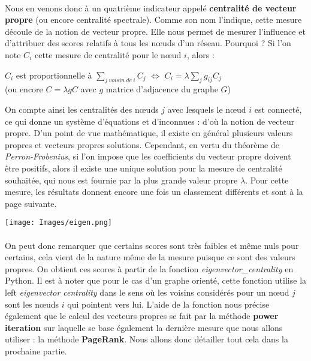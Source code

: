 \documentclass[14pt, openany]{article}
\begin{document}
\paragraph{}
Nous en venons donc à un quatrième indicateur appelé \textbf{centralité de vecteur propre} (ou encore centralité spectrale). Comme son nom l'indique, cette mesure découle de la notion de vecteur propre. Elle nous permet de mesurer l'influence et d'attribuer des scores relatifs à tous les nœuds d'un réseau. Pourquoi ? Si l'on note $C_i$ cette mesure de centralité pour le nœud $i$, alors :\\
\begin{center}
$C_i$ est proportionnelle à $\sum\limits_{j~voisin~de~i}C_j$ $\Leftrightarrow$ $C_i = \lambda\sum\limits_{j}g_{ij}C_j$\\ (ou encore $C=\lambda g C$ avec $g$ matrice d'adjacence du graphe $G$)
\end{center}
On compte ainsi les centralités des nœuds $j$ avec lesquels le nœud $i$ est connecté, ce qui donne un système d'équations et d'inconnues : d'où la notion de vecteur propre. D'un point de vue mathématique, il existe en général plusieurs valeurs propres et vecteurs propres solutions. Cependant, en vertu du théorème de \textit{Perron-Frobenius}, si l'on impose que les coefficients du vecteur propre doivent être positifs, alors il existe une unique solution pour la mesure de centralité souhaitée, qui nous est fournie par la plus grande valeur propre $\lambda$. Pour cette mesure, les résultats donnent encore une fois un classement différents et sont à la page suivante.
\begin{center}
\texttt{[image: Images/eigen.png]}
\label{fig1}
\end{center}
\paragraph{}
\paragraph{}
On peut donc remarquer que certains scores sont très faibles et même nuls pour certains, cela vient de la nature même de la mesure puisque ce sont des valeurs propres. On obtient ces scores à partir de la fonction \textit{eigenvector\_centrality} en Python. Il est à noter que pour le cas d'un graphe orienté, cette fonction utilise la \og left \fg{} \textit{eigenvector centrality} dans le sens où les voisins considérés pour un nœud $j$ sont les nœuds $i$ qui pointent vers lui. L'aide de la fonction nous précise également que le calcul des vecteurs propres se fait par la méthode \textbf{power iteration} sur laquelle se base également la dernière mesure que nous allons utiliser : la méthode \textbf{PageRank}. Nous allons donc détailler tout cela dans la prochaine partie.
\end{document}

